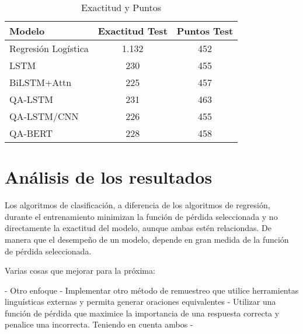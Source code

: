 \begin{table}[!tb]
  \begin{center}
    \caption{Exactitud y Puntos}
    \begin{tabular}{l|c|c}
      \textbf{Modelo} & \textbf{Exactitud Test} & \textbf{Puntos Test} \\
      \hline
      Regresión Logística & 1.132 & 452\\
      LSTM & 230 & 455 \\
      BiLSTM+Attn  & 225 & 457 \\
      QA-LSTM & 231 & 463 \\
      QA-LSTM/CNN & 226 & 455 \\
      QA-BERT & 228 & 458 \\ 
    \end{tabular}
  \end{center}
  \label{results_all}
\end{table}


\section{Análisis de los resultados}

Los algoritmos de clasificación, a diferencia de los algoritmos de regresión, durante el entrenamiento minimizan la función de pérdida seleccionada y no directamente la exactitud del modelo, aunque ambas estén relaciondas. De manera que el desempeño de un modelo, depende en gran medida de la función de pérdida seleccionada. 


Varias cosas que mejorar para la próxima:

- Otro enfoque
- Implementar otro método de remuestreo que utilice herramientas linguísticas externas y permita generar oraciones equivalentes
- Utilizar una función de pérdida que maximice la importancia de una respuesta correcta y penalice una incorrecta. Teniendo en cuenta ambos 
-



